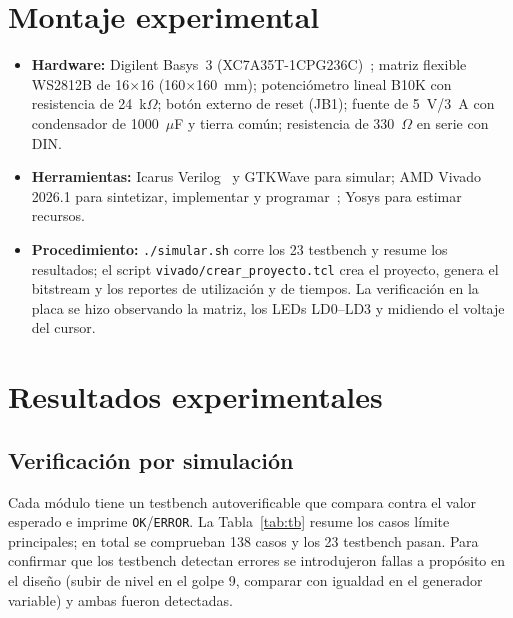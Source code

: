 \documentclass[conference]{IEEEtran}
\begin{document}
\section{Montaje experimental}
\begin{itemize}
\item \textbf{Hardware:} Digilent Basys~3 (XC7A35T-1CPG236C)~\cite{basys3}; matriz flexible WS2812B
de 16$\times$16 (160$\times$160~mm); potenciómetro lineal B10K con resistencia de 24~k$\Omega$;
botón externo de reset (JB1); fuente de 5~V/3~A con condensador de
1000~$\mu$F y tierra común; resistencia de 330~$\Omega$ en serie con DIN.
\item \textbf{Herramientas:} Icarus Verilog~\cite{iverilog} y GTKWave para simular; AMD Vivado 2026.1 para sintetizar,
implementar y programar~\cite{vivado}; Yosys para estimar recursos.
\item \textbf{Procedimiento:} \texttt{./simular.sh} corre los 23 testbench y resume los resultados; el
script \texttt{vivado/crear\_proyecto.tcl} crea el proyecto, genera el bitstream y los reportes de
utilización y de tiempos. La verificación en la placa se hizo observando la matriz, los LEDs LD0--LD3
y midiendo el voltaje del cursor.
\end{itemize}


\section{Resultados experimentales}

\subsection{Verificación por simulación}
Cada módulo tiene un testbench autoverificable que compara contra el valor esperado e imprime
\texttt{OK}/\texttt{ERROR}. La Tabla~\ref{tab:tb} resume los casos límite principales; en total se
comprueban 138 casos y los 23 testbench pasan. Para confirmar que los testbench detectan errores se
introdujeron fallas a propósito en el diseño (subir de nivel en el golpe 9, comparar con igualdad en el
generador variable) y ambas fueron detectadas.
\end{document}
